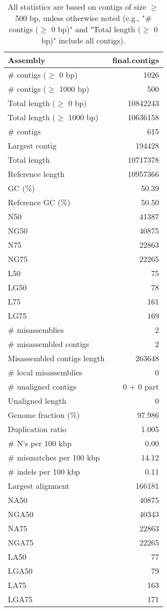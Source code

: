 \documentclass[12pt,a4paper]{article}
\begin{document}
\begin{table}[ht]
\begin{center}
\caption{All statistics are based on contigs of size $\geq$ 500 bp, unless otherwise noted (e.g., "\# contigs ($\geq$ 0 bp)" and "Total length ($\geq$ 0 bp)" include all contigs).}
\begin{tabular}{|l*{1}{|r}|}
\hline
Assembly & final.contigs \\ \hline
\# contigs ($\geq$ 0 bp) & 1026 \\ \hline
\# contigs ($\geq$ 1000 bp) & 500 \\ \hline
Total length ($\geq$ 0 bp) & 10842243 \\ \hline
Total length ($\geq$ 1000 bp) & 10636158 \\ \hline
\# contigs & 615 \\ \hline
Largest contig & 194428 \\ \hline
Total length & 10717378 \\ \hline
Reference length & 10957366 \\ \hline
GC (\%) & 50.39 \\ \hline
Reference GC (\%) & 50.50 \\ \hline
N50 & 41387 \\ \hline
NG50 & 40875 \\ \hline
N75 & 22863 \\ \hline
NG75 & 22265 \\ \hline
L50 & 75 \\ \hline
LG50 & 78 \\ \hline
L75 & 161 \\ \hline
LG75 & 169 \\ \hline
\# misassemblies & 2 \\ \hline
\# misassembled contigs & 2 \\ \hline
Misassembled contigs length & 263648 \\ \hline
\# local misassemblies & 0 \\ \hline
\# unaligned contigs & 0 + 0 part \\ \hline
Unaligned length & 0 \\ \hline
Genome fraction (\%) & 97.986 \\ \hline
Duplication ratio & 1.005 \\ \hline
\# N's per 100 kbp & 0.00 \\ \hline
\# mismatches per 100 kbp & 14.12 \\ \hline
\# indels per 100 kbp & 0.11 \\ \hline
Largest alignment & 166181 \\ \hline
NA50 & 40875 \\ \hline
NGA50 & 40343 \\ \hline
NA75 & 22863 \\ \hline
NGA75 & 22265 \\ \hline
LA50 & 77 \\ \hline
LGA50 & 79 \\ \hline
LA75 & 163 \\ \hline
LGA75 & 171 \\ \hline
\end{tabular}
\end{center}
\end{table}
\end{document}
